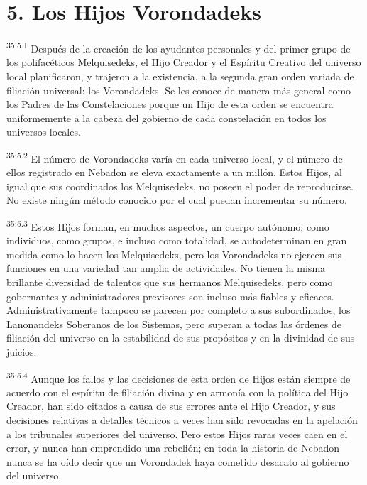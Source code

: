 \section*{5. Los Hijos Vorondadeks}
\par
\textsuperscript{35:5.1} Después de la creación de los ayudantes personales y del primer grupo de los polifacéticos Melquisedeks, el Hijo Creador y el Espíritu Creativo del universo local planificaron, y trajeron a la existencia, a la segunda gran orden variada de filiación universal: los Vorondadeks. Se les conoce de manera más general como los Padres de las Constelaciones porque un Hijo de esta orden se encuentra uniformemente a la cabeza del gobierno de cada constelación en todos los universos locales.

\par
\textsuperscript{35:5.2} El número de Vorondadeks varía en cada universo local, y el número de ellos registrado en Nebadon se eleva exactamente a un millón. Estos Hijos, al igual que sus coordinados los Melquisedeks, no poseen el poder de reproducirse. No existe ningún método conocido por el cual puedan incrementar su número.

\par
\textsuperscript{35:5.3} Estos Hijos forman, en muchos aspectos, un cuerpo autónomo; como individuos, como grupos, e incluso como totalidad, se autodeterminan en gran medida como lo hacen los Melquisedeks, pero los Vorondadeks no ejercen sus funciones en una variedad tan amplia de actividades. No tienen la misma brillante diversidad de talentos que sus hermanos Melquisedeks, pero como gobernantes y administradores previsores son incluso más fiables y eficaces. Administrativamente tampoco se parecen por completo a sus subordinados, los Lanonandeks Soberanos de los Sistemas, pero superan a todas las órdenes de filiación del universo en la estabilidad de sus propósitos y en la divinidad de sus juicios.

\par
\textsuperscript{35:5.4} Aunque los fallos y las decisiones de esta orden de Hijos están siempre de acuerdo con el espíritu de filiación divina y en armonía con la política del Hijo Creador, han sido citados a causa de sus errores ante el Hijo Creador, y sus decisiones relativas a detalles técnicos a veces han sido revocadas en la apelación a los tribunales superiores del universo. Pero estos Hijos raras veces caen en el error, y nunca han emprendido una rebelión; en toda la historia de Nebadon nunca se ha oído decir que un Vorondadek haya cometido desacato al gobierno del universo.

